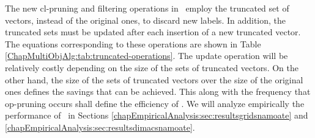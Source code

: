 The new cl-pruning and filtering operations in \namoate \ employ the truncated set of vectors, instead of the original ones, to discard new labels. In addition, the truncated sets must be updated after each insertion of a new truncated vector. The equations corresponding to these operations are shown in Table \ref{ChapMultiObjAlg:tab:truncated-operations}. The update operation will be relatively costly depending on the size of the sets of truncated vectors. On the other hand, the size of the sets of truncated vectors over the size of the original ones defines the savings that can be achieved. This along with the frequency that op-pruning occurs shall define the efficiency of \namoate. We will analyze empirically the performance of \namoate \ in Sections \ref{chapEmpiricalAnalysis:sec:resultsgridsnamoate} and \ref{chapEmpiricalAnalysis:sec:resultsdimacsnamoate}. 

\begin{table}
\caption{New operations over truncated sets of vectors.}
\label{ChapMultiObjAlg:tab:truncated-operations} 
\end{table}

